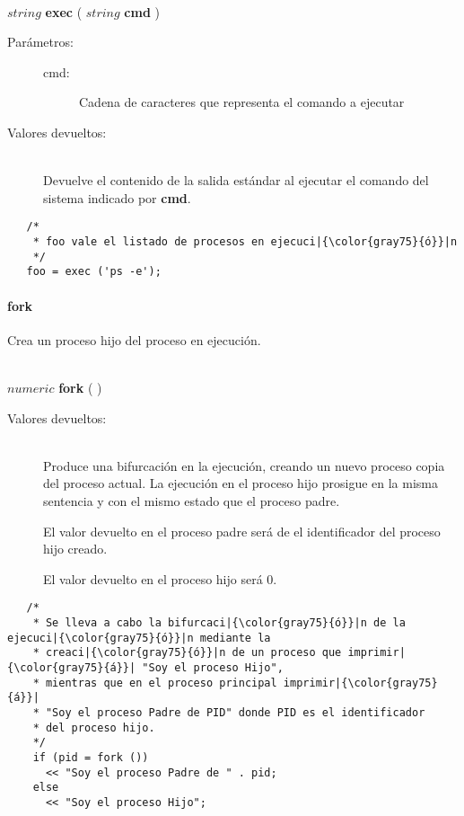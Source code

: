 \begin{framed}
\hfill \\ $string$ \textbf{exec} ( $string$ \textbf{cmd} )  
\begin{description}
\item [Parámetros:] \hfill 
   \begin{description}
   \item[cmd:] Cadena de caracteres que representa el comando a ejecutar
   \end{description}
\item[Valores devueltos:] \hfill \\
   Devuelve el contenido de la salida estándar al ejecutar el comando del sistema indicado por \textbf{cmd}.
\end{description}
\end{framed}
     
\begin{lstlisting}   
   /*
    * foo vale el listado de procesos en ejecuci|{\color{gray75}{ó}}|n
    */
   foo = exec ('ps -e');
\end{lstlisting}

\paragraph{fork}
Crea un proceso hijo del proceso en ejecución.


\begin{framed}
\hfill \\ $numeric$ \textbf{fork} ( )  
\begin{description}
\item[Valores devueltos:] \hfill \\
   Produce una bifurcación en la ejecución, creando un nuevo proceso copia del 
   proceso actual. La ejecución en el proceso hijo prosigue en la misma sentencia 
   y con el mismo estado que el proceso padre. 
   
   El valor devuelto en el proceso padre será de el identificador del proceso hijo creado. 
   
   El valor devuelto en el proceso hijo será $0$.
\end{description}
\end{framed}
     
\begin{lstlisting}   
   /*
    * Se lleva a cabo la bifurcaci|{\color{gray75}{ó}}|n de la ejecuci|{\color{gray75}{ó}}|n mediante la 
    * creaci|{\color{gray75}{ó}}|n de un proceso que imprimir|{\color{gray75}{á}}| "Soy el proceso Hijo",
    * mientras que en el proceso principal imprimir|{\color{gray75}{á}}| 
    * "Soy el proceso Padre de PID" donde PID es el identificador
    * del proceso hijo.
    */
    if (pid = fork ()) 
      << "Soy el proceso Padre de " . pid;
    else
      << "Soy el proceso Hijo";
\end{lstlisting}

